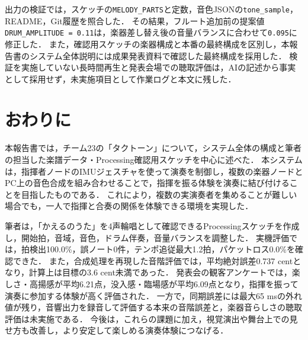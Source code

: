\documentclass[uplatex,dvipdfmx]{jlreq}
\begin{document}
出力の検証では，スケッチの\texttt{MELODY\_PARTS}と定数，音色JSONの\texttt{tone\_sample}，README，Git履歴を照合した．
その結果，フルート追加前の提案値\texttt{DRUM\_AMPLITUDE = 0.11}は，楽器差し替え後の音量バランスに合わせて\texttt{0.095}に修正した．
また，確認用スケッチの楽器構成と本番の最終構成を区別し，本報告書のシステム全体説明には成果発表資料で確認した最終構成を採用した．
検証を実施していない長時間再生と発表会場での聴取評価は，AIの記述から事実として採用せず，未実施項目として作業ログと本文に残した．

\section{おわりに}
本報告書では，チーム23の「タクトーン」について，システム全体の構成と筆者の担当した楽譜データ・Processing確認用スケッチを中心に述べた．
本システムは，指揮者ノードのIMUジェスチャを使って演奏を制御し，複数の楽器ノードとPC上の音色合成を組み合わせることで，指揮を振る体験を演奏に結び付けることを目指したものである．
これにより，複数の実演奏者を集めることが難しい場合でも，一人で指揮と合奏の関係を体験できる環境を実現した．

筆者は，「かえるのうた」を4声輪唱として確認できるProcessingスケッチを作成し，開始拍，音域，音色，ドラム伴奏，音量バランスを調整した．
実機評価では，拍検出100.0\%，誤ノート0件，テンポ追従最大1.2拍，パケットロス0.0\%を確認できた．
また，合成処理を再現した音階評価では，平均絶対誤差0.737 centとなり，計算上は目標の3.6 cent未満であった．
発表会の観客アンケートでは，楽しさ・高揚感が平均6.21点，没入感・臨場感が平均6.09点となり，指揮を振って演奏に参加する体験が高く評価された．
一方で，同期誤差には最大65 msの外れ値が残り，音響出力を録音して評価する本来の音階誤差と，楽器音らしさの聴取評価は未実施である．
今後は，これらの課題に加え，視覚演出や舞台上での見せ方も改善し，より安定して楽しめる演奏体験につなげる．
\end{document}
